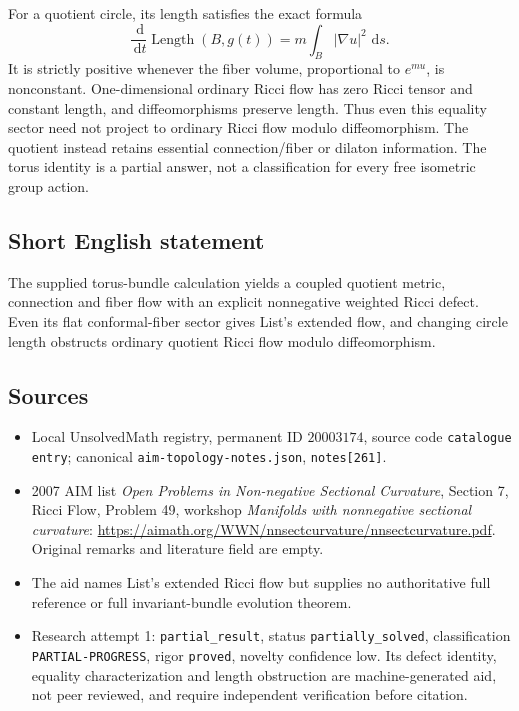 \documentclass[11pt]{article}
\newcommand{\dd}{\,\mathrm{d}}
\begin{document}
For a quotient circle, its length satisfies the exact formula
\[
\frac{\dd}{\dd t}\operatorname{Length}(B,g(t))
=m\int_B|\nabla u|^2\,\dd s.
\]
It is strictly positive whenever the fiber volume, proportional to $e^{mu}$, is nonconstant. One-dimensional ordinary Ricci flow has zero Ricci tensor and constant length, and diffeomorphisms preserve length. Thus even this equality sector need not project to ordinary Ricci flow modulo diffeomorphism. The quotient instead retains essential connection/fiber or dilaton information. The torus identity is a partial answer, not a classification for every free isometric group action.
\subsection{Short English statement}
The supplied torus-bundle calculation yields a coupled quotient metric, connection and fiber flow with an explicit nonnegative weighted Ricci defect. Even its flat conformal-fiber sector gives List's extended flow, and changing circle length obstructs ordinary quotient Ricci flow modulo diffeomorphism.
\subsection{Sources}
\begin{itemize}
\item Local UnsolvedMath registry, permanent ID $20003174$, source code \texttt{catalogue entry}; canonical \texttt{aim-topology-notes.json}, \texttt{notes[261]}.
\item 2007 AIM list \emph{Open Problems in Non-negative Sectional Curvature}, Section 7, Ricci Flow, Problem 49, workshop \emph{Manifolds with nonnegative sectional curvature}: \url{https://aimath.org/WWN/nnsectcurvature/nnsectcurvature.pdf}. Original remarks and literature field are empty.
\item The aid names List's extended Ricci flow but supplies no authoritative full reference or full invariant-bundle evolution theorem.
\item Research attempt 1: \texttt{partial\_result}, status \texttt{partially\_solved}, classification \texttt{PARTIAL-PROGRESS}, rigor \texttt{proved}, novelty confidence low. Its defect identity, equality characterization and length obstruction are machine-generated aid, not peer reviewed, and require independent verification before citation.
\end{itemize}
\end{document}
